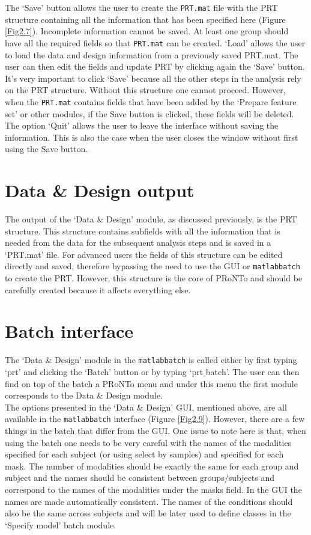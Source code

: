 The `Save' button allows the user to create the {\tt PRT.mat} file with the PRT structure containing all the information that has been specified here (Figure \ref{Fig2.7}). Incomplete information cannot be saved. At least one group should have all the required fields so that {\tt PRT.mat} can be created. `Load' allows the user to load the data and design information from a previously saved PRT.mat. The user can then edit the fields and update PRT by clicking again the `Save' button. It's very important to click `Save' because all the other steps in the analysis rely on the PRT structure. Without this structure one cannot proceed. However, when the {\tt PRT.mat} contains fields that have been added by the `Prepare feature set' or other modules, if the Save button is clicked, these fields will be deleted. The option `Quit' allows the user to leave the interface without saving the information. This is also the case when the user closes the window without first using the Save button.



\section{Data \& Design output}

The output of the `Data \& Design' module, as discussed previously, is the PRT structure. This structure contains subfields with all the information that is needed from the data for the subsequent analysis steps and is saved in a `PRT.mat' file. For advanced users the fields of this structure can be edited directly and saved, therefore bypassing the need to use the GUI or  {\tt matlabbatch} to create the PRT. However, this structure is the core of PRoNTo and should be carefully created because it affects everything else.


\section{Batch interface}

The `Data \& Design' module in the {\tt matlabbatch} is called either by first typing `prt' and clicking the `Batch' button or by typing `prt$\_$batch'. The user can then find on top of the batch a PRoNTo menu and under this menu the first module corresponds to the Data \& Design module.
\\

The options presented in the `Data \& Design' GUI, mentioned above, are all available in the {\tt matlabbatch} interface (Figure \ref{Fig2.9}). However, there are a few things in the batch that differ from the GUI. One issue to note here is that, when using the batch one needs to be very careful with the names of the modalities specified for each subject (or using select by samples) and specified for each mask. The number of modalities should be exactly the same for each group and subject and the names should be consistent between groups/subjects and correspond to the names of the modalities under the masks field. In the GUI the names are made automatically consistent. The names of the conditions should also be the same across subjects and will be later used to define classes in the `Specify model' batch module.
\\

